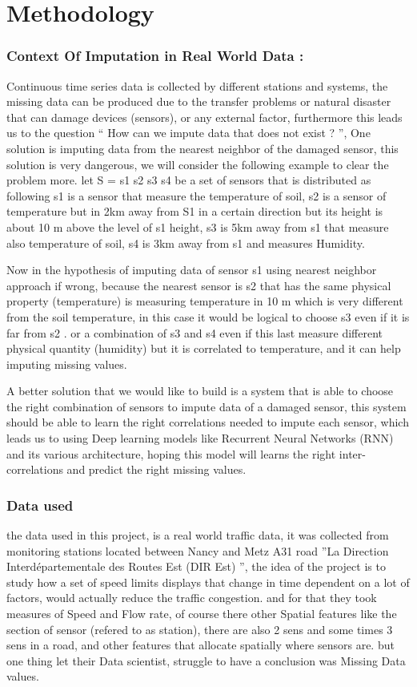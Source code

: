 
\chapter{Methodology} \label{ML}


\subsection{Context Of Imputation in Real World Data :}\label{contextofimp}
 Continuous time series data is collected by different stations and systems, the missing data can be produced due to the transfer problems or natural disaster that can damage devices (sensors), or any external factor, furthermore this leads us to the question “ How can we impute data that does not exist ? ”, One solution is imputing  data from the nearest neighbor of the damaged sensor, this solution is very dangerous, we will  consider the following example to clear the problem more.
let S = {s1 s2 s3 s4 } be a set of sensors that is distributed as following s1 is a sensor  that measure the temperature of soil, s2 is a sensor of temperature but in 2km away from S1 in a certain direction but its height is about 10 m above the level of s1 height, s3  is 5km away from s1 that measure also temperature of soil,  s4  is 3km away from s1  and  measures Humidity.

Now in the hypothesis of imputing data of sensor s1  using nearest neighbor approach if wrong, because the nearest  sensor is s2  that has the same physical property (temperature) is measuring  temperature in 10 m which is very different from the soil temperature, in this case it would be logical to choose s3 even if it is far from s2 . or a combination of s3 and s4 even if this last measure different physical quantity (humidity) but it is correlated to temperature, and it can help imputing missing values.

A better solution that we would like to build is a system that is able to choose the right combination of sensors to impute data of a damaged sensor, this system should be able to learn the right correlations needed to impute each sensor, which leads us to using Deep learning models like Recurrent Neural Networks (RNN) and its various architecture, hoping this model will learns the right inter-correlations and predict the right missing values.

\subsection{Data used}
the  data used in this project, is a real world traffic data, it was collected from  monitoring stations located between Nancy and  Metz  A31  road ''La Direction Interdépartementale des Routes Est (DIR Est) '', the idea of the project is to study  how  a set of speed limits displays that change in time dependent on a lot of factors, would actually reduce the traffic congestion.
and for that they took measures of Speed and Flow rate, of course there other Spatial features like the section of sensor (refered to as station), there are also 2 sens and some times 3 sens in a road, and other features that allocate spatially where sensors are.
but one thing let their Data scientist, struggle to have a conclusion was Missing Data values.


